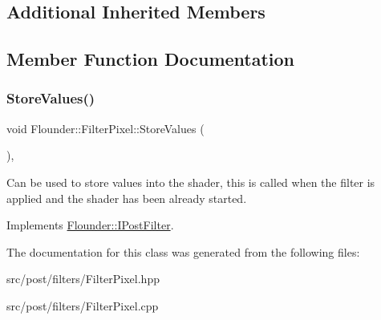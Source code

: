 \subsection*{Additional Inherited Members}


\subsection{Member Function Documentation}
\mbox{\label{class_flounder_1_1_filter_pixel_a284c86691c5919ac56452580e9047658}} 
\subsubsection{\texorpdfstring{Store\+Values()}{StoreValues()}}
{\footnotesize\ttfamily void Flounder\+::\+Filter\+Pixel\+::\+Store\+Values (\begin{DoxyParamCaption}{ }\end{DoxyParamCaption})\hspace{0.3cm}{\ttfamily [override]}, {\ttfamily [virtual]}}



Can be used to store values into the shader, this is called when the filter is applied and the shader has been already started. 



Implements \hyperlink{class_flounder_1_1_i_post_filter_a20420ec0a9bac67437740552bea9ab74}{Flounder\+::\+I\+Post\+Filter}.



The documentation for this class was generated from the following files\+:\begin{DoxyCompactItemize}
\item 
src/post/filters/Filter\+Pixel.\+hpp\item 
src/post/filters/Filter\+Pixel.\+cpp\end{DoxyCompactItemize}
